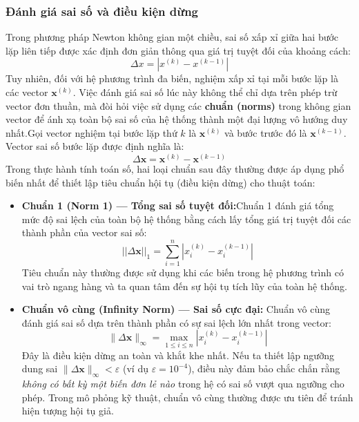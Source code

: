 \subsubsection{Đánh giá sai số và điều kiện dừng}Trong phương pháp Newton không gian một chiều, sai số xấp xỉ giữa hai bước lặp liên tiếp được xác định đơn giản thông qua giá trị tuyệt đối của khoảng cách:\begin{equation}\Delta x = \left| x^{(k)} - x^{(k-1)} \right|\end{equation}Tuy nhiên, đối với hệ phương trình đa biến, nghiệm xấp xỉ tại mỗi bước lặp là các vector $\mathbf{x}^{(k)}$. Việc đánh giá sai số lúc này không thể chỉ dựa trên phép trừ vector đơn thuần, mà đòi hỏi việc sử dụng các \textbf{chuẩn (norms)} trong không gian vector để ánh xạ toàn bộ sai số của hệ thống thành một đại lượng vô hướng duy nhất.Gọi vector nghiệm tại bước lặp thứ $k$ là $\mathbf{x}^{(k)}$ và bước trước đó là $\mathbf{x}^{(k-1)}$. Vector sai số bước lặp được định nghĩa là:\begin{equation}\Delta\mathbf{x} = \mathbf{x}^{(k)} - \mathbf{x}^{(k-1)}\end{equation}Trong thực hành tính toán số, hai loại chuẩn sau đây thường được áp dụng phổ biến nhất để thiết lập tiêu chuẩn hội tụ (điều kiện dừng) cho thuật toán:\begin{itemize}\item \textbf{Chuẩn 1 (Norm 1) — Tổng sai số tuyệt đối:}Chuẩn 1 đánh giá tổng mức độ sai lệch của toàn bộ hệ thống bằng cách lấy tổng giá trị tuyệt đối các thành phần của vector sai số:\begin{equation}|| \Delta\mathbf{x} ||_ 1 = \sum_{i=1}^{n} \left| x_i^{(k)} - x_i^{(k-1)} \right|\end{equation}Tiêu chuẩn này thường được sử dụng khi các biến trong hệ phương trình có vai trò ngang hàng và ta quan tâm đến sự hội tụ tích lũy của toàn hệ thống.\item \textbf{Chuẩn vô cùng (Infinity Norm) — Sai số cực đại:}
Chuẩn vô cùng đánh giá sai số dựa trên thành phần có sự sai lệch lớn nhất trong vector:
\begin{equation}
    \| \Delta\mathbf{x} \|_\infty = \max_{1 \le i \le n} \left| x_i^{(k)} - x_i^{(k-1)} \right|
\end{equation}
Đây là điều kiện dừng an toàn và khắt khe nhất. Nếu ta thiết lập ngưỡng dung sai $\| \Delta\mathbf{x} \|_\infty < \varepsilon$ (ví dụ $\varepsilon = 10^{-4}$), điều này đảm bảo chắc chắn rằng \textit{không có bất kỳ một biến đơn lẻ nào} trong hệ có sai số vượt qua ngưỡng cho phép. Trong mô phỏng kỹ thuật, chuẩn vô cùng thường được ưu tiên để tránh hiện tượng hội tụ giả.
\end{itemize}

